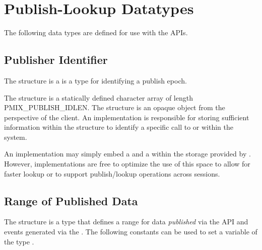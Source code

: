 \section{Publish-Lookup Datatypes}

The following data types are defined for use with the  \acp{API}.


\subsection{Publisher Identifier}
The  structure is a is a  type for identifying a publish epoch.

The  structure is a statically defined character array of length
PMIX_PUBLISH_IDLEN. 
The structure is an opaque object from the perspective of the client.
An implementation is responsible for storing sufficient information within the structure to identify 
a specific call to  or  within the system.

\adviceimplstart
An implementation may simply embed a  and a  within 
the storage provided by .  However, implementations are free to optimize the
use of this space to allow for faster lookup or to support publish/lookup operations across sessions.
\adviceimplend

\subsection{Range of Published Data}

The  structure is a  type that defines a range for data \textit{published} via the  \ac{API} and events generated via the .
The following constants can be used to set a variable of the type .

